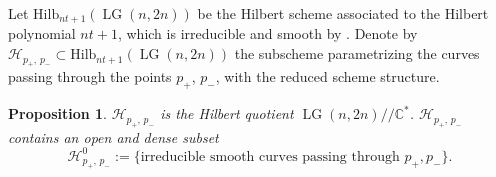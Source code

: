 \documentclass[10pt]{amsart}
\newtheorem{proposition}[theorem]{Proposition}
\theoremstyle{definition}
\newcommand{\LG}{\operatorname{LG}}
\theoremstyle{plain} %
\begin{document}
Let  $\mathrm{Hilb}_{nt+1}(\LG(n,2n))$ be the Hilbert scheme associated to the Hilbert polynomial $nt+1$, which is irreducible and smooth
by \cite{Pe02}. Denote by $\mathcal H_{p_+,\, p_-}\subset\mathrm{Hilb}_{nt+1}(\LG(n,2n))$ the subscheme parametrizing the  curves passing through the points $p_+$, $p_-$, with the reduced scheme structure. 
\begin{proposition}\label{density}
$\mathcal H_{p_+,\, p_-}$ is the Hilbert quotient $\LG(n,2n)\! /\!/\mathbb C^*$. $\mathcal H_{p_+,\, p_-}$ contains an open and dense subset
\begin{equation*}
 \mathcal H^0_{p_+,\, p_-}:=\{\text {irreducible smooth curves passing through}\,\,p_+,p_-\}.     
\end{equation*}   
\end{proposition}
\end{document}
